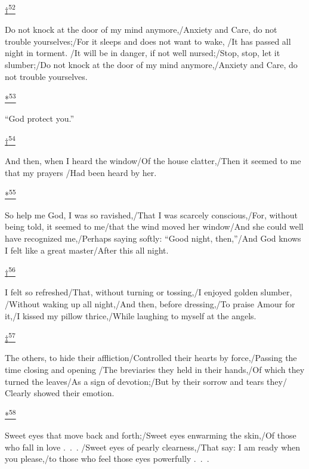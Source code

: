 \protect\hypertarget{23_NOTES.xhtmlux5cux23id_2850}{\protect\hyperlink{21_Chapter_Thirteen__IMAGE_AND_WORD.xhtmlux5cux23id_2849}{†\textsuperscript{52}}}
Do not knock at the door of my mind anymore,/Anxiety and Care, do not
trouble yourselves;/For it sleeps and does not want to wake, /It has
passed all night in torment. /It will be in danger, if not well
nursed;/Stop, stop, let it slumber;/Do not knock at the door of my mind
anymore,/Anxiety and Care, do not trouble yourselves.

\protect\hypertarget{23_NOTES.xhtmlux5cux23id_2848}{\protect\hyperlink{21_Chapter_Thirteen__IMAGE_AND_WORD.xhtmlux5cux23id_2847}{*\textsuperscript{53}}}
``God protect you.''

\protect\hypertarget{23_NOTES.xhtmlux5cux23id_2846}{\protect\hyperlink{21_Chapter_Thirteen__IMAGE_AND_WORD.xhtmlux5cux23id_2845}{†\textsuperscript{54}}}
And then, when I heard the window/Of the house clatter,/Then it seemed
to me that my prayers /Had been heard by her.

\protect\hypertarget{23_NOTES.xhtmlux5cux23id_2844}{\protect\hyperlink{21_Chapter_Thirteen__IMAGE_AND_WORD.xhtmlux5cux23id_2843}{*\textsuperscript{55}}}
So help me God, I was so ravished,/That I was scarcely conscious,/For,
without being told, it seemed to me/that the wind moved her window/And
she could well have recognized me,/Perhaps saying softly: ``Good night,
then,''/And God knows I felt like a great master/After this all night.

\protect\hypertarget{23_NOTES.xhtmlux5cux23id_2842}{\protect\hyperlink{21_Chapter_Thirteen__IMAGE_AND_WORD.xhtmlux5cux23id_2841}{†\textsuperscript{56}}}
I felt so refreshed/That, without turning or tossing,/I enjoyed golden
slumber, /Without waking up all night,/And then, before dressing,/To
praise Amour for it,/I kissed my pillow thrice,/While laughing to myself
at the angels.

\protect\hypertarget{23_NOTES.xhtmlux5cux23id_2840}{\protect\hyperlink{21_Chapter_Thirteen__IMAGE_AND_WORD.xhtmlux5cux23id_2839}{‡\textsuperscript{57}}}
The others, to hide their affliction/Controlled their hearts by
force,/Passing the time closing and opening /The breviaries they held in
their hands,/Of which they turned the leaves/As a sign of devotion;/But
by their sorrow and tears they/ Clearly showed their emotion.

\protect\hypertarget{23_NOTES.xhtmlux5cux23id_2838}{\protect\hyperlink{21_Chapter_Thirteen__IMAGE_AND_WORD.xhtmlux5cux23id_2837}{*\textsuperscript{58}}}
Sweet eyes that move back and forth;/Sweet eyes enwarming the skin,/Of
those who fall in love .~.~. /Sweet eyes of pearly clearness,/That say:
I am ready when you please,/to those who feel those eyes powerfully
.~.~.

